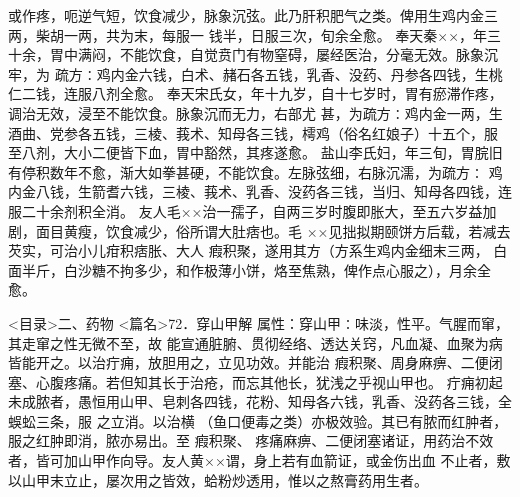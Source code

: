 \documentclass[a4paper,12pt,UTF8,twoside]{ctexbook}
\begin{document}
或作疼，呃逆气短，饮食减少，脉象沉弦。此乃肝积肥气之类。俾用生鸡内金三两，柴胡一两，共为末，每服一 
钱半，日服三次，旬余全愈。 
奉天秦××，年三十余，胃中满闷，不能饮食，自觉贲门有物窒碍，屡经医治，分毫无效。脉象沉牢，为 
疏方∶鸡内金六钱，白术、赭石各五钱，乳香、没药、丹参各四钱，生桃仁二钱，连服八剂全愈。 
奉天宋氏女，年十九岁，自十七岁时，胃有瘀滞作疼，调治无效，浸至不能饮食。脉象沉而无力，右部尤 
甚，为疏方∶鸡内金一两，生酒曲、党参各五钱，三棱、莪术、知母各三钱，樗鸡（俗名红娘子）十五个，服 
至八剂，大小二便皆下血，胃中豁然，其疼遂愈。 
盐山李氏妇，年三旬，胃脘旧有停积数年不愈，渐大如拳甚硬，不能饮食。左脉弦细，右脉沉濡，为疏方∶ 
鸡内金八钱，生箭耆六钱，三棱、莪术、乳香、没药各三钱，当归、知母各四钱，连服二十余剂积全消。 
友人毛××治一孺子，自两三岁时腹即胀大，至五六岁益加剧，面目黄瘦，饮食减少，俗所谓大肚痞也。毛 
××见拙拟期颐饼方后载，若减去芡实，可治小儿疳积痞胀、大人 瘕积聚，遂用其方（方系生鸡内金细末三两， 
白面半斤，白沙糖不拘多少，和作极薄小饼，烙至焦熟，俾作点心服之），月余全愈。 

<目录>二、药物
<篇名>72．穿山甲解
属性：穿山甲∶味淡，性平。气腥而窜，其走窜之性无微不至，故 
能宣通脏腑、贯彻经络、透达关窍，凡血凝、血聚为病皆能开之。以治疔痈，放胆用之，立见功效。并能治 
瘕积聚、周身麻痹、二便闭塞、心腹疼痛。若但知其长于治疮，而忘其他长，犹浅之乎视山甲也。 
疔痈初起未成脓者，愚恒用山甲、皂刺各四钱，花粉、知母各六钱，乳香、没药各三钱，全蜈蚣三条，服 
之立消。以治横 （鱼口便毒之类）亦极效验。其已有脓而红肿者，服之红肿即消，脓亦易出。至 瘕积聚、 
疼痛麻痹、二便闭塞诸证，用药治不效者，皆可加山甲作向导。友人黄××谓，身上若有血箭证，或金伤出血 
不止者，敷以山甲末立止，屡次用之皆效，蛤粉炒透用，惟以之熬膏药用生者。 
\end{document}
